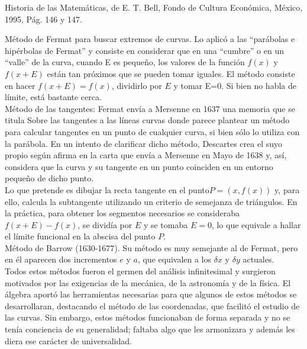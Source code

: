 \documentclass[10pt,twoside]{SelfArx} %
\begin{document}
 Historia de las Matemáticas, de E. T. Bell, Fondo de
Cultura Económica, México, 1995, Pág. 146 y 147. 

Método de Fermat para buscar extremos de curvas. Lo aplicó a las 
“parábolas e hipérbolas de Fermat” y consiste en considerar que en una
“cumbre” o en un “valle” de la curva, cuando E es pequeño, los valores de la función $ f(x) $ y $ f(x+E) $ están tan próximos que se pueden tomar iguales. El método consiste en hacer $ f(x+E)=f(x) $, dividirlo por $ E $ y tomar E=0. Si bien no habla de límite, está bastante cerca. \\
Método de las tangentes:
 Fermat envía a Mersenne en 1637 una memoria que se titula Sobre las tangentes a las líneas curvas donde parece plantear un método para calcular tangentes en un punto de cualquier curva, si bien sólo lo utiliza con la parábola. En un intento de clarificar dicho método, Descartes crea el suyo propio según afirma en la carta que envía a Mersenne en Mayo de 1638 y, así, considera que la curva y su tangente en un punto coinciden en un entorno pequeño de dicho punto.\\
  Lo que pretende es dibujar la recta tangente en el punto$  P=(x,f(x)) $ y, para ello, calcula la subtangente  utilizando un criterio de semejanza de triángulos. En la práctica, para obtener los segmentos necesarios se consideraba $ f(x+E)-f(x) $, se dividía por $ E $ y se tomaba $ E=0 $, lo que equivale a hallar el límite funcional en la abscisa del punto $ P $.\\
Método de Barrow (1630-1677). Su método es muy semejante al de
Fermat, pero en él aparecen dos incrementos $ e $ y $ a $, que equivalen a los $ \delta x $  y 
$ \delta y $ actuales. \\
Todos estos métodos fueron el germen del análisis infinitesimal y surgieron motivados por las exigencias de la mecánica, de la astronomía y de la física. El álgebra aportó las herramientas necesarias para que algunos de estos métodos se desarrollaran, destacando el método de las coordenadas, que facilitó el estudio de las curvas. Sin embargo, estos métodos funcionaban de forma separada y no se tenía conciencia de su generalidad; faltaba algo que les armonizara y además les diera ese carácter de universalidad.
\end{document}
